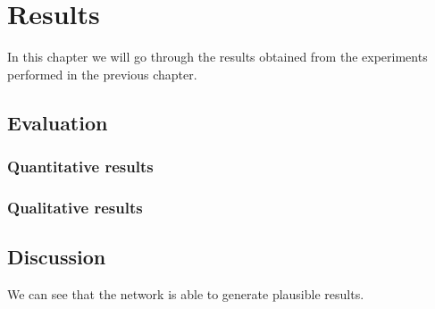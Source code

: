 
\chapter{Results}\label{chap:results}

In this chapter we will go through the results obtained from the experiments
performed in the previous chapter.

\section{Evaluation}

\subsection{Quantitative results}

\subsection{Qualitative results}

\section{Discussion}

We can see that the network is able to generate plausible results.

